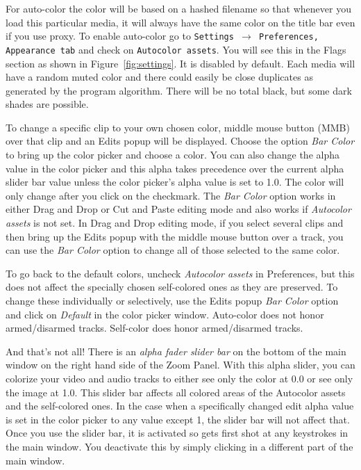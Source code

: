For auto-color the color will be based on a hashed filename so that whenever you load this particular media, it will always have the same color on the title bar even if you use proxy.  
To enable auto-color go to \texttt{Settings $\rightarrow$ Preferences, Appearance tab} and check on \texttt{Autocolor assets}. You will see this in the Flags section
as shown in Figure~\ref{fig:settings}.  It is disabled by default.  
Each media will have a random muted color and there could easily be close duplicates as generated by the program algorithm.  There will be no total black, but some dark shades are possible.  

To change a specific clip to your own chosen color, middle mouse button (MMB) over that clip and an Edits popup will be displayed.  
Choose the option \textit{Bar Color} to bring up the color picker and choose a color.   
You can also change the alpha value in the color picker and this alpha takes precedence over the current alpha slider bar value unless the color picker's alpha value is set to 1.0.   
The color will only change after you click on the checkmark.  
The \emph{Bar Color} option works in either Drag and Drop or Cut and Paste editing mode and also works if \textit{Autocolor assets} is not set.  
In Drag and Drop editing mode, if you select several clips and then bring up the Edits popup with the middle mouse button over a track, you can use the \emph{Bar Color} option to change all of those selected to the same color.

To go back to the default colors, uncheck \textit{Autocolor assets} in Preferences, but this does not affect the specially chosen self-colored ones as they are preserved.  
To change these individually or  selectively, use the Edits popup \emph{Bar Color} option and click on \textit{Default} in the color picker window.  Auto-color does not honor armed/disarmed tracks.  
Self-color does honor armed/disarmed tracks.

And that’s not all!  
There is an \emph{alpha fader slider bar} on the bottom of the main window on the right hand side of the Zoom Panel.  
With this alpha slider, you can colorize your video and audio tracks to either see only the color at 0.0 or see only the image at 1.0.  
This slider bar affects all colored areas of the Autocolor assets and the self-colored ones.  
In the case when a specifically changed edit alpha value is set in the color picker
to any value except 1, the slider bar will not affect that.  
Once you use the slider bar, it is activated so gets first shot at any keystrokes in the main window.  
You deactivate this by simply clicking in a different part of the main window.  

